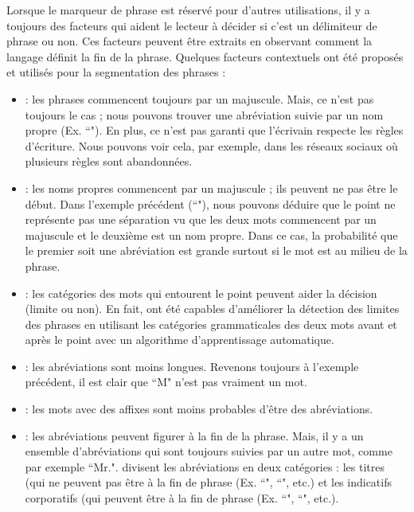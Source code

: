 \documentclass{KodeBook}
\begin{document}
Lorsque le marqueur de phrase est réservé pour d'autres utilisations, il y a toujours des facteurs qui aident le lecteur à décider si c'est un délimiteur de phrase ou non.
Ces facteurs peuvent être extraits en observant comment la langage définit la fin de la phrase. 
Quelques facteurs contextuels ont été proposés et utilisés pour la segmentation des phrases \cite{10-palmer} :
\begin{itemize}
	\item {} : les phrases commencent toujours par un majuscule. 
	Mais, ce n'est pas toujours le cas ; nous pouvons trouver une abréviation suivie par un nom propre (Ex. ``"). 
	En plus, ce n'est pas garanti que l'écrivain respecte les règles d'écriture. 
	Nous pouvons voir cela, par exemple, dans les réseaux sociaux où plusieurs règles sont abandonnées.
	
	\item {} : les noms propres commencent par un majuscule ; ils peuvent ne pas être le début.
	Dans l'exemple précédent (``"), nous pouvons déduire que le point ne représente pas une séparation vu que les deux mots commencent par un majuscule et le deuxième est un nom propre. 
	Dans ce cas, la probabilité que le premier soit une abréviation est grande surtout si le mot est au milieu de la phrase.
	
	\item {} : les catégories des mots qui entourent le point peuvent aider la décision (limite ou non). 
	En fait,  \citet{97-palmer-hearst} ont été capables d'améliorer la détection des limites des phrases en utilisant les catégories grammaticales des deux mots avant et après le point avec un algorithme d'apprentissage automatique. 
	
	\item {} : les abréviations sont moins longues.
	Revenons toujours à l'exemple précédent, il est clair que ``M" n'est pas vraiment un mot. 
	
	\item {} : les mots avec des affixes sont moins probables d'être des abréviations.
	
	\item {} : les abréviations peuvent figurer à la fin de la phrase. 
	Mais, il y a un ensemble d'abréviations qui sont toujours suivies par un autre mot, comme par exemple ``Mr.".
	\citet{89-riley,97-reynar-ratnaparkhi} divisent les abréviations en deux catégories : les titres (qui ne peuvent pas être à la fin de phrase (Ex. ``", ``", etc.) et les indicatifs corporatifs (qui peuvent être à la fin de phrase (Ex. ``", ``", etc.).
\end{itemize}
\end{document}
